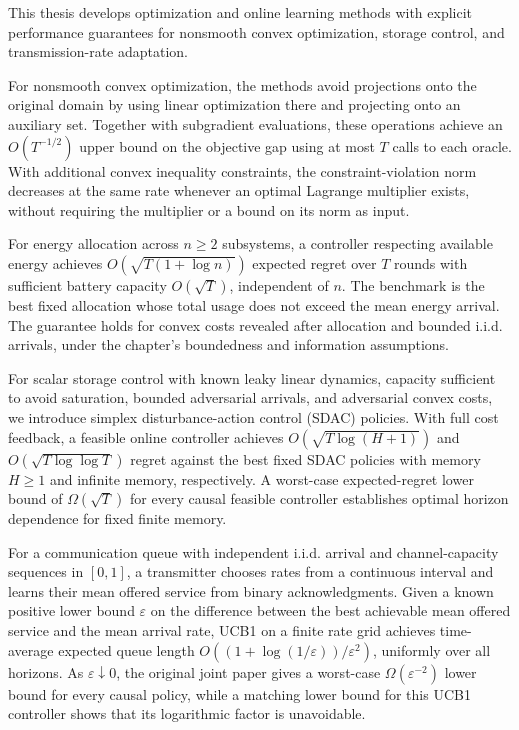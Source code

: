 This thesis develops optimization and online learning methods
with explicit performance guarantees for nonsmooth convex optimization,
storage control, and transmission-rate adaptation.

For nonsmooth convex optimization, the methods avoid projections onto the
original domain by using linear optimization there and projecting onto an
auxiliary set. Together with subgradient evaluations, these operations achieve
an $O(T^{-1/2})$ upper bound on the objective gap using at most $T$ calls to
each oracle. With additional convex inequality constraints, the
constraint-violation norm decreases at the same rate whenever an optimal
Lagrange multiplier exists, without requiring the multiplier or a bound on
its norm as input.

For energy allocation across $n\ge2$ subsystems, a controller respecting
available energy achieves $O(\sqrt{T(1+\log n)})$ expected regret over $T$
rounds with sufficient battery capacity $O(\sqrt T)$, independent of $n$.
The benchmark is the best fixed allocation whose total usage does not exceed
the mean energy arrival. The guarantee holds for convex costs revealed after
allocation and bounded i.i.d. arrivals, under the chapter's boundedness and
information assumptions.

For scalar storage control with known leaky linear dynamics, capacity
sufficient to avoid saturation, bounded adversarial arrivals, and adversarial
convex costs, we introduce simplex disturbance-action control (SDAC) policies.
With full cost feedback, a feasible online controller achieves
$O(\sqrt{T\log(H+1)})$ and $O(\sqrt{T\log\log T})$ regret against the best
fixed SDAC policies with memory $H\ge1$ and infinite memory, respectively.
A worst-case expected-regret lower bound of $\Omega(\sqrt T)$ for every
causal feasible controller establishes optimal horizon dependence for fixed
finite memory.

For a communication queue with independent i.i.d. arrival and
channel-capacity sequences in $[0,1]$, a transmitter chooses rates from a
continuous interval and learns their mean offered service from binary
acknowledgments. Given a known positive lower bound $\varepsilon$ on the
difference between the best achievable mean offered service and the mean
arrival rate, UCB1 on a finite rate grid achieves time-average expected queue
length $O((1+\log(1/\varepsilon))/\varepsilon^2)$, uniformly over all horizons.
As $\varepsilon\downarrow0$, the original joint paper gives a worst-case
$\Omega(\varepsilon^{-2})$ lower bound for every causal policy, while a
matching lower bound for this UCB1 controller shows that its logarithmic
factor is unavoidable.
